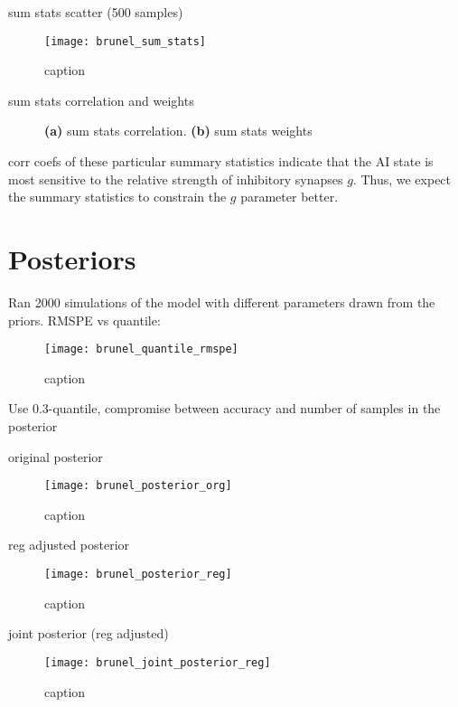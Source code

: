 sum stats scatter (500 samples)

\begin{figure}[H]
    \centering
    \texttt{[image: brunel\_sum\_stats]}
    \caption{caption}
    \label{fig:fig1}
\end{figure}


sum stats correlation and weights

\begin{figure}[H]
\centering
{}
\qquad
{}
\caption{\textbf{(a)} sum stats correlation. \textbf{(b)} sum stats weights
}
\label{fig:fig1}
\end{figure}

corr coefs of these particular summary statistics indicate that the AI state is most sensitive to the relative strength of inhibitory synapses $g$. Thus, we expect the summary statistics to constrain the $g$ parameter better.


\section{Posteriors} 

Ran 2000 simulations of the model with different parameters drawn from the priors. RMSPE vs quantile: 

\begin{figure}[H]
    \centering
    \texttt{[image: brunel\_quantile\_rmspe]}
    \caption{caption}
    \label{fig:fig1}
\end{figure}

Use 0.3-quantile, compromise between accuracy and number of samples in the posterior

original posterior

\begin{figure}[H]
    \centering
    \texttt{[image: brunel\_posterior\_org]}
    \caption{caption}
    \label{fig:fig1}
\end{figure}

reg adjusted posterior

\begin{figure}[H]
    \centering
    \texttt{[image: brunel\_posterior\_reg]}
    \caption{caption}
    \label{fig:fig1}
\end{figure}


joint posterior (reg adjusted)

\begin{figure}[H]
    \centering
    \texttt{[image: brunel\_joint\_posterior\_reg]}
    \caption{caption}
    \label{fig:fig1}
\end{figure}

